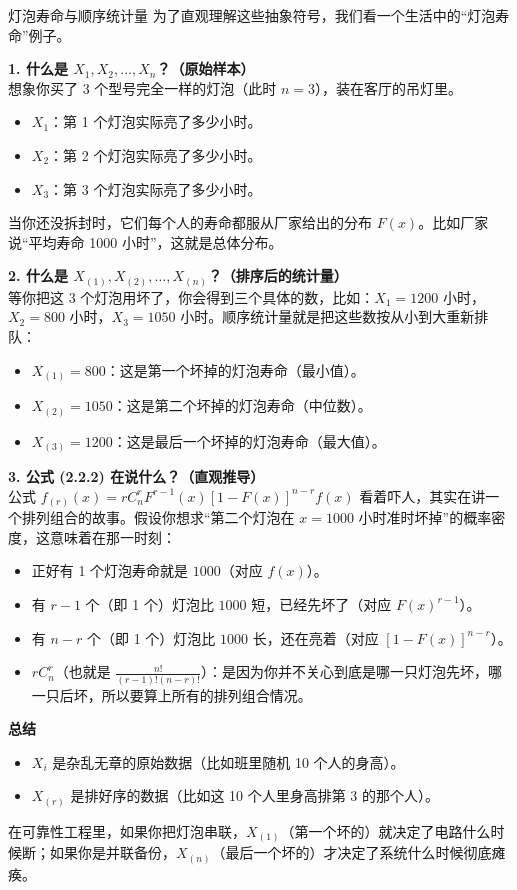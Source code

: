 \begin{example}{灯泡寿命与顺序统计量}
为了直观理解这些抽象符号，我们看一个生活中的“灯泡寿命”例子。

\textbf{1. 什么是 $X_1, X_2, \dots, X_n$？（原始样本）} \\
想象你买了 3 个型号完全一样的灯泡（此时 $n=3$），装在客厅的吊灯里。
\begin{itemize}
    \item $X_1$：第 1 个灯泡实际亮了多少小时。
    \item $X_2$：第 2 个灯泡实际亮了多少小时。
    \item $X_3$：第 3 个灯泡实际亮了多少小时。
\end{itemize}
当你还没拆封时，它们每个人的寿命都服从厂家给出的分布 $F(x)$。比如厂家说“平均寿命 1000 小时”，这就是总体分布。

\textbf{2. 什么是 $X_{(1)}, X_{(2)}, \dots, X_{(n)}$？（排序后的统计量）} \\
等你把这 3 个灯泡用坏了，你会得到三个具体的数，比如：$X_1 = 1200$ 小时，$X_2 = 800$ 小时，$X_3 = 1050$ 小时。顺序统计量就是把这些数按从小到大重新排队：
\begin{itemize}
    \item $X_{(1)} = 800$：这是第一个坏掉的灯泡寿命（最小值）。
    \item $X_{(2)} = 1050$：这是第二个坏掉的灯泡寿命（中位数）。
    \item $X_{(3)} = 1200$：这是最后一个坏掉的灯泡寿命（最大值）。
\end{itemize}

\textbf{3. 公式 (2.2.2) 在说什么？（直观推导）} \\
公式 $f_{(r)}(x) = r C_n^r F^{r-1}(x) [1 - F(x)]^{n-r} f(x)$ 看着吓人，其实在讲一个排列组合的故事。假设你想求“第二个灯泡在 $x=1000$ 小时准时坏掉”的概率密度，这意味着在那一时刻：
\begin{itemize}
    \item 正好有 1 个灯泡寿命就是 $1000$（对应 $f(x)$）。
    \item 有 $r-1$ 个（即 1 个）灯泡比 $1000$ 短，已经先坏了（对应 $F(x)^{r-1}$）。
    \item 有 $n-r$ 个（即 1 个）灯泡比 $1000$ 长，还在亮着（对应 $[1-F(x)]^{n-r}$）。
    \item $r C_n^r$（也就是 $\frac{n!}{(r-1)!(n-r)!}$）：是因为你并不关心到底是哪一只灯泡先坏，哪一只后坏，所以要算上所有的排列组合情况。
\end{itemize}

\textbf{总结} \\
\begin{itemize}
    \item $X_i$ 是杂乱无章的原始数据（比如班里随机 10 个人的身高）。
    \item $X_{(r)}$ 是排好序的数据（比如这 10 个人里身高排第 3 的那个人）。
\end{itemize}
在可靠性工程里，如果你把灯泡串联，$X_{(1)}$（第一个坏的）就决定了电路什么时候断；如果你是并联备份，$X_{(n)}$（最后一个坏的）才决定了系统什么时候彻底瘫痪。
\end{example}
